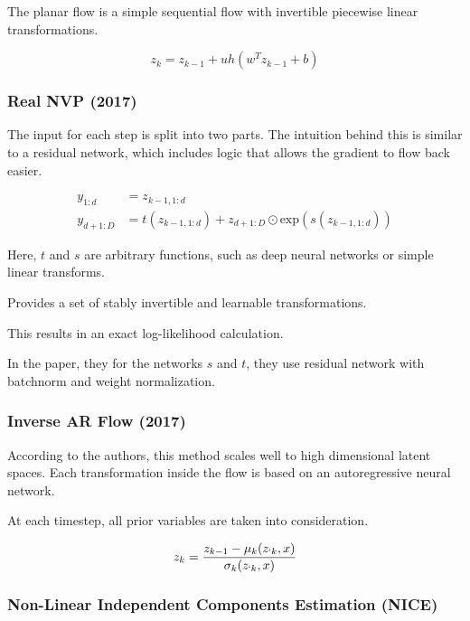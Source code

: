 \documentclass[a4paper,12pt,twoside,openright]{report}
\begin{document}
The planar flow is a simple sequential flow with invertible piecewise linear transformations.

\begin{equation}
z_k = z_{k-1} + uh (w^T z_{k-1} + b)
\end{equation}

\subsubsection{Real NVP (2017)}

The input for each step is split into two parts.
The intuition behind this is similar to a residual network, which includes logic that allows the gradient to flow back easier.

\begin{align}
y_{1:d} &= z_{k-1, 1:d} \\
y_{d+1:D} &= t(z_{k-1, 1:d}) + z_{d+1:D} \odot \text{exp}(s(z_{k-1, 1:d}))
\end{align}

Here, $t$ and $s$ are arbitrary functions, such as deep neural networks or simple linear transforms.


Provides a set of stably invertible and learnable transformations.


This results in an exact log-likelihood calculation.

In the paper, they for the networks $s$ and $t$, they use residual network with batchnorm and weight normalization.




\subsubsection{Inverse AR Flow (2017)}

According to the authors, this method scales well to high dimensional latent spaces.
Each transformation inside the flow is based on an autoregressive neural network.

At each timestep, all prior variables are taken into consideration.

\begin{equation}
z_k = \frac{z_{k-1} - \mu_k (z_{\lq k}, x) }{\sigma_k(z_{\lq k}, x)}
\end{equation}

\subsubsection{Non-Linear Independent Components Estimation (NICE)}
\end{document}
